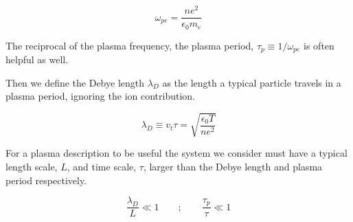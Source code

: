         \[ \omega_{pe} = \frac{ne^2}{\epsilon_0 m_e} \]

        The reciprocal of the plasma frequency, the plasma period, \(\tau_p \equiv 1/\omega_{pe}\) is often
        helpful as well.

        Then we define the Debye length \(\lambda_D\) as the length a typical particle
        travels in a plasma period, ignoring the ion contribution.

        \[\lambda_D \equiv v_t \tau = \sqrt{\frac{\epsilon_0 T}{n e^2}}\]

        For a plasma description to be useful the system we consider must have
        a typical length scale, \(L\), and time scale, \(\tau\), larger than the Debye length and plasma
        period respectively.

        \[\frac{\lambda_D}{L} \ll 1  \qquad{;} \qquad \frac{\tau_p}{\tau} \ll 1 \]


















